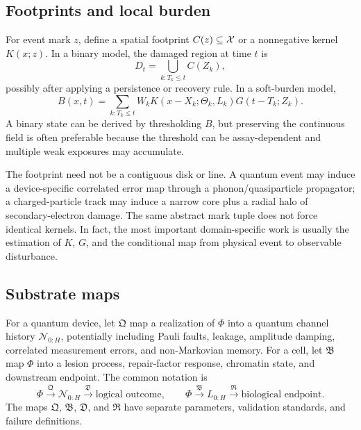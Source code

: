 \documentclass[11pt,a4paper,oneside]{article}
\begin{document}
\subsection{Footprints and local burden}
For event mark \(z\), define a spatial footprint \(C(z)\subseteq\mathcal{X}\) or a nonnegative kernel \(K(x;z)\). In a binary model, the damaged region at time \(t\) is
\begin{equation}\label{eq:damage-union}
D_t=\bigcup_{k:T_k\le t} C(Z_k),
\end{equation}
possibly after applying a persistence or recovery rule. In a soft-burden model,
\begin{equation}\label{eq:burden}
B(x,t)=\sum_{k:T_k\le t} W_k K(x-X_k;\Theta_k,L_k)G(t-T_k;Z_k).
\end{equation}
A binary state can be derived by thresholding \(B\), but preserving the continuous field is often preferable because the threshold can be assay-dependent and multiple weak exposures may accumulate.

The footprint need not be a contiguous disk or line. A quantum event may induce a device-specific correlated error map through a phonon/quasiparticle propagator; a charged-particle track may induce a narrow core plus a radial halo of secondary-electron damage. The same abstract mark tuple does not force identical kernels. In fact, the most important domain-specific work is usually the estimation of \(K\), \(G\), and the conditional map from physical event to observable disturbance.

\subsection{Substrate maps}
For a quantum device, let \(\mathfrak{Q}\) map a realization of \(\Phi\) into a quantum channel history \(\mathcal{N}_{0:H}\), potentially including Pauli faults, leakage, amplitude damping, correlated measurement errors, and non-Markovian memory. For a cell, let \(\mathfrak{B}\) map \(\Phi\) into a lesion process, repair-factor response, chromatin state, and downstream endpoint. The common notation is
\begin{equation}\label{eq:substrate-map}
\Phi\xrightarrow{\mathfrak{Q}}\mathcal{N}_{0:H}\xrightarrow{\mathfrak{D}}\text{logical outcome},\qquad
\Phi\xrightarrow{\mathfrak{B}}L_{0:H}\xrightarrow{\mathfrak{R}}\text{biological endpoint}.
\end{equation}
The maps \(\mathfrak{Q}\), \(\mathfrak{B}\), \(\mathfrak{D}\), and \(\mathfrak{R}\) have separate parameters, validation standards, and failure definitions.
\end{document}

